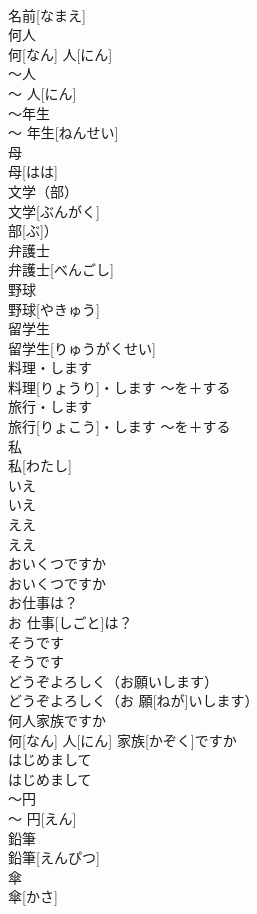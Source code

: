 \documentclass[8pt]{extreport}
\begin{document}
\begin{CJK}{UTF8}{min}
\\	名前[なまえ]		
\\	何人	
\\	何[なん] 人[にん]		
\\	〜人	
\\	〜 人[にん]		
\\	〜年生	
\\	〜 年生[ねんせい]		
\\	母	
\\	母[はは]		
\\	文学（部）	
\\	文学[ぶんがく]
\\	部[ぶ]）		
\\	弁護士	
\\	弁護士[べんごし]		
\\	野球	
\\	野球[やきゅう]		
\\	留学生	
\\	留学生[りゅうがくせい]		
\\	料理・します	
\\	料理[りょうり]・します	〜を＋する	
\\	旅行・します	
\\	旅行[りょこう]・します	〜を＋する	
\\	私	
\\	私[わたし]		
\\	いえ	
\\	いえ		
\\	ええ	
\\	ええ		
\\	おいくつですか	
\\	おいくつですか		
\\	お仕事は？	
\\	お 仕事[しごと]は？		
\\	そうです	
\\	そうです		
\\	どうぞよろしく（お願いします）	
\\	どうぞよろしく（お 願[ねが]いします）		
\\	何人家族ですか	
\\	何[なん] 人[にん] 家族[かぞく]ですか		
\\	はじめまして	
\\	はじめまして		
\\	〜円	
\\	〜 円[えん]		
\\	鉛筆	
\\	鉛筆[えんぴつ]		
\\	傘	
\\	傘[かさ]		

\end{CJK}
\end{document}
